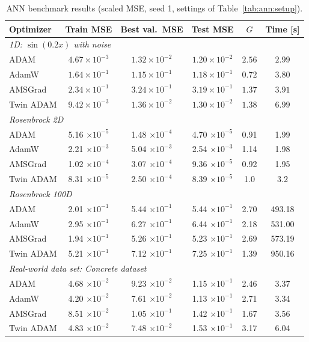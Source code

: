 \documentclass[11pt,a4paper]{article}
\begin{document}
\begin{table}[!htbp]
  \centering
  \caption{ANN benchmark results (scaled MSE, seed 1, settings of Table~\ref{tab:ann:setup}).}
  \label{tab:ann:results}
  \small
  \begin{tabular}{lccccc}
    \toprule
    \textbf{Optimizer} & \textbf{Train MSE} & \textbf{Best val.\ MSE} & \textbf{Test MSE} & \textbf{$G$} & \textbf{Time [s]}  \\
    \midrule
    \multicolumn{6}{l}{\textit{1D: $\sin(0.2x)$ with noise}} \\
    ADAM      & $4.67\times10^{-3}$ & $1.32\times10^{-2}$ & $1.20\times10^{-2}$ & $2.56$ & $2.99$ \\
    AdamW     & $1.64\times10^{-1}$ & $1.15\times10^{-1}$ & $1.18\times10^{-1}$ & $0.72$ & $3.80$ \\
    AMSGrad   & $2.34\times10^{-1}$ & $3.24\times10^{-1}$ & $3.19\times10^{-1}$ & $1.37$ & $3.91$ \\
    Twin ADAM & $9.42\times10^{-3}$ & $1.36\times10^{-2}$ & $1.30\times10^{-2}$ & $1.38$ & $6.99$ \\
    \midrule
    \multicolumn{6}{l}{\textit{Rosenbrock 2D}} \\
    ADAM      & 5.16 $\times10^{-5}$ & 1.48 $\times10^{-4}$ & 4.70 $\times10^{-5}$ & 0.91 & 1.99  \\
    AdamW     & 2.21 $\times10^{-3}$ & 5.04 $\times10^{-3}$ & 2.54 $\times10^{-3}$ & 1.14 & 1.98  \\
    AMSGrad   & 1.02 $\times10^{-4}$ & 3.07 $\times10^{-4}$ & 9.36 $\times10^{-5}$ & 0.92 & 1.95 \\
    Twin ADAM & 8.31 $\times10^{-5}$ & 2.50 $\times10^{-4}$ & 8.39 $\times10^{-5}$ & 1.0 & 3.2  \\
    \midrule
    \multicolumn{6}{l}{\textit{Rosenbrock 100D}} \\
    ADAM      & 2.01 $\times10^{-1}$ & 5.44 $\times10^{-1}$ & 5.44 $\times10^{-1}$ & 2.70 & 493.18  \\
    AdamW     & 2.95 $\times10^{-1}$ & 6.27 $\times10^{-1}$ & 6.44 $\times10^{-1}$ & 2.18 & 531.00  \\
    AMSGrad   & 1.94 $\times10^{-1}$ & 5.26 $\times10^{-1}$ & 5.23 $\times10^{-1}$ & 2.69 & 573.19 \\
    Twin ADAM & 5.21 $\times10^{-1}$ & 7.12 $\times10^{-1}$ & 7.25 $\times10^{-1}$ & 1.39 & 950.16 \\
    \midrule
    \multicolumn{6}{l}{\textit{Real-world data set: Concrete dataset}} \\
    ADAM      & 4.68 $\times10^{-2}$ & 9.23 $\times10^{-2}$ & 1.15 $\times10^{-1}$ & 2.46  & 3.37  \\
    AdamW     & 4.20 $\times10^{-2}$ & 7.61 $\times10^{-2}$ & 1.13 $\times10^{-1}$ & 2.71  & 3.34\\
    AMSGrad   & 8.51 $\times10^{-2}$ & 1.05 $\times10^{-1}$ & 1.42 $\times10^{-1}$ & 1.67 & 3.56   \\
    Twin ADAM & 4.83 $\times10^{-2}$ & 7.48 $\times10^{-2}$ & 1.53 $\times10^{-1}$ & 3.17 & 6.04  \\
    \bottomrule
  \end{tabular}
\end{table}
\end{document}
